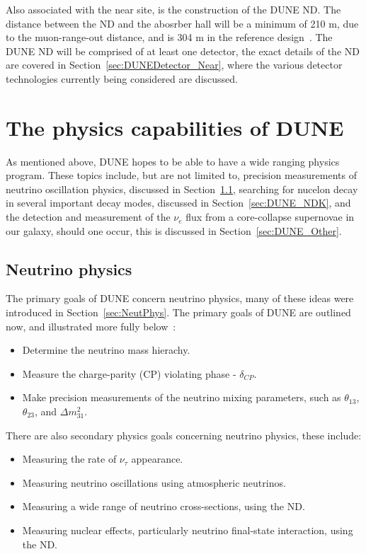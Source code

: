 Also associated with the near site, is the construction of the DUNE ND. The distance between the ND and the abosrber hall will be a minimum of 210 m, due to the muon-range-out distance, and is 304 m in the reference design~\citep{DUNECDR_V3}. The DUNE ND will be comprised of at least one detector, the exact details of the ND are covered in Section~\ref{sec:DUNEDetector_Near}, where the various detector technologies currently being considered are discussed. \\

\section{The physics capabilities of DUNE} \label{sec:DUNEPhys}%
As mentioned above, DUNE hopes to be able to have a wide ranging physics program. These topics include, but are not limited to, precision measurements of neutrino oscillation physics, discussed in Section~\ref{sec:DUNEPhys_Neut}, searching for nucelon decay in several important decay modes, discussed in Section~\ref{sec:DUNE_NDK}, and the detection and measurement of the $\nu_e$ flux from a core-collapse supernovae in our galaxy, should one occur, this is discussed in Section~\ref{sec:DUNE_Other}. \\

\subsection{Neutrino physics} \label{sec:DUNEPhys_Neut} %
The primary goals of DUNE concern neutrino physics, many of these ideas were introduced in Section~\ref{sec:NeutPhys}. The primary goals of DUNE are outlined now, and illustrated more fully below~\citep{DUNECDR_V2}:
\begin{itemize}
\item Determine the neutrino mass hierachy.
\item Measure the charge-parity (CP) violating phase - $\delta_{CP}$.
\item Make precision measurements of the neutrino mixing parameters, such as $\theta_{13}$, $\theta_{23}$, and $\Delta m^{2}_{31}$.
\end{itemize}
There are also secondary physics goals concerning neutrino physics, these include:
\begin{itemize}
\item Measuring the rate of $\nu_{\tau}$ appearance.
\item Measuring neutrino oscillations using atmospheric neutrinos.
\item Measuring a wide range of neutrino cross-sections, using the ND.
\item Measuring nuclear effects, particularly neutrino final-state interaction, using the ND.
\end{itemize}

